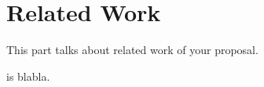 
\section{Related Work} \label{ch:related}

This part talks about related work of your proposal.

\smt is blabla.


